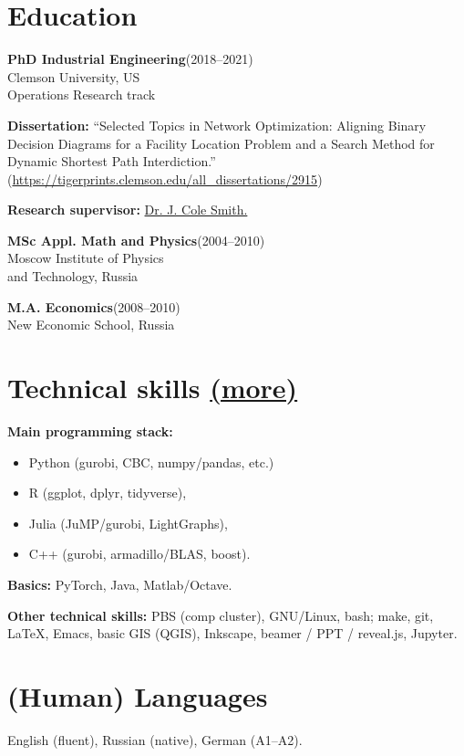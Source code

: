 \documentclass[11pt, a4paper]{article} \usepackage{geometry} %
\newcommand{\edu}[3]{
  \textbf{#1}\hfill (#2)\\
  #3\vspace{0.7em}}
\newcommand{\mhref}[1]{\hfill\href{#1}{\small (more\faExternalLink*)}}
\begin{document}
 \noindent
 \begin{minipage}[t]{0.48\textwidth}
   \section*{Education}
   \edu{PhD Industrial Engineering}{2018--2021}{
     Clemson University, US\\
     Operations Research track}

  \noindent\textbf{Dissertation:} ``Selected Topics in Network Optimization:
  Aligning Binary Decision Diagrams for a Facility Location Problem and a Search
  Method for Dynamic Shortest Path Interdiction.''\\
  \noindent (\href{https://tigerprints.clemson.edu/all_dissertations/2915}{\footnotesize https://tigerprints.clemson.edu/all\_dissertations/2915})
  \vspace{0.5em}

\textbf{Research supervisor:}
  \href{https://scholar.google.com/citations?user=87CaUHYAAAAJ&hl=en}{Dr. J. Cole
    Smith.}\vspace{0.7em}

   \edu{MSc Appl. Math and Physics}{2004--2010}{
     Moscow Institute of Physics\\
     and Technology, Russia}

   \edu{M.A. Economics}{2008--2010}{
   New Economic School, Russia}

\end{minipage}\hfill%
\begin{minipage}[t]{0.49\textwidth}
   \section*{Technical skills \mhref{https://www.bochkarev.io/notes/stack/}}
   \textbf{Main programming stack:}
   \begin{itemize}
     \itemsep0pt
   \item Python (gurobi, CBC, numpy/pandas, etc.)
     \item R (ggplot, dplyr, tidyverse),
     \item Julia (JuMP/gurobi, LightGraphs),
     \item C++ (gurobi, armadillo/BLAS, boost).
   \end{itemize}\vspace{0.5em}
   \textbf{Basics:} PyTorch, Java, Matlab/Octave. \vspace{0.5em}

   \textbf{Other technical skills:}
   PBS (comp cluster), GNU/Linux, bash; make, git, \LaTeX, Emacs, basic GIS
   (QGIS), Inkscape, beamer / PPT / reveal.js, Jupyter.\vspace{0.7em}

    \section*{(Human) Languages}
    English (fluent), Russian (native), German (A1--A2).

   \end{minipage}
   \vspace{1em}
\end{document}
